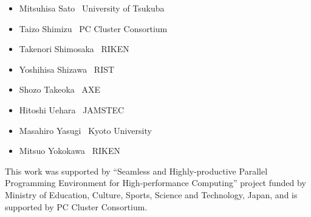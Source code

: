 \documentclass[a4paper,11pt,twoside]{report}
\begin{document}
\begin{itemize}
\item Mitsuhisa Sato     \dotfill \ University of Tsukuba
\item Taizo Shimizu      \dotfill \ PC Cluster Consortium
\item Takenori Shimosaka \dotfill \ RIKEN
\item Yoshihisa Shizawa  \dotfill \ RIST
\item Shozo Takeoka      \dotfill \ AXE
\item Hitoshi Uehara     \dotfill \ JAMSTEC
\item Masahiro Yasugi    \dotfill \ Kyoto University
\item Mitsuo Yokokawa    \dotfill \ RIKEN
\end{itemize}

This work was supported by ``Seamless and Highly-productive Parallel
Programming Environment for High-performance Computing'' project funded
by Ministry of Education, Culture, Sports, Science and Technology,
Japan, and is supported by PC Cluster Consortium.

\newpage
\mbox{}\newpage

\pagestyle{fancy}
\fancyhead{} %
\fancyhead[RE]{\leftmark}
\fancyhead[LO]{\rightmark}
\fancyhead[LE,RO]{\thepage}
\fancyfoot{} %
\renewcommand{\headrulewidth}{0pt}
\renewcommand{\footrulewidth}{0pt}



\cleardoublepage






\cleardoublepage



\cleardoublepage


\cleardoublepage

\end{document}
